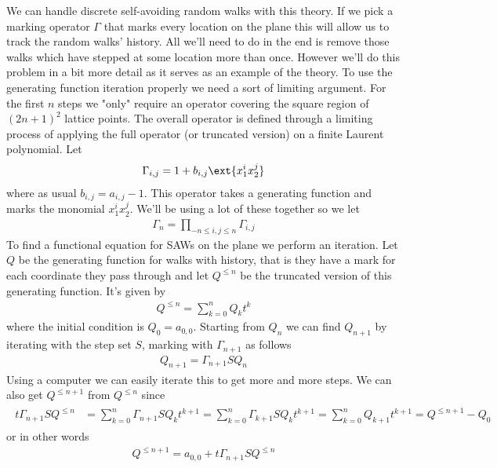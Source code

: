 We can handle discrete self-avoiding random walks with this theory. If we pick a marking operator $\Gamma$ that marks every location on the plane this will allow us to track the random walks' history. All we'll need to do in the end is remove those walks which have stepped at some location more than once. However we'll do this problem in a bit more detail as it serves as an example of the theory. To use the generating function iteration properly we need a sort of limiting argument. For the first $n$ steps we "only" require an operator covering the square region of $(2n+1)^2$ lattice points. The overall operator is defined through a limiting process of applying the full operator (or truncated version) on a finite Laurent polynomial. Let
\begin{align}
\Gamma_{i,j} = 1+b_{i,j}\ext{x_1^ix_2^j}
\end{align}
where as usual $b_{i,j} = a_{i,j}-1$. This operator takes a generating function and marks the monomial $x_1^ix_2^j$. We'll be using a lot of these together so we let
\begin{align}
\Gamma_n = \prod_{-n\leq i,j\leq n}\Gamma_{i,j}
\end{align}
To find a functional equation for SAWs on the plane we perform an iteration. Let $Q$ be the generating function for walks with history, that is they have a mark for each coordinate they pass through and let $Q^{\leq n}$ be the truncated version of this generating function. It's given by
\begin{align}
Q^{\leq n} = \sum_{k=0}^{n} Q_k t^k
\end{align}
where the initial condition is $Q_0 = a_{0,0}$. Starting from $Q_n$ we can find $Q_{n+1}$ by iterating with the step set $S$, marking with $\Gamma_{n+1}$ as follows
\begin{align}
	Q_{n+1} = \Gamma_{n+1}SQ_n
\end{align}
Using a computer we can easily iterate this to get more and more steps. We can also get $Q^{\leq n+1}$ from $Q^{\leq n}$ since
\begin{align}\begin{split}
	t\Gamma_{n+1}SQ^{\leq n} & = \sum_{k=0}^n \Gamma_{n+1}SQ_kt^{k+1}= \sum_{k=0}^n \Gamma_{k+1}SQ_kt^{k+1} = \sum_{k=0}^n Q_{k+1}t^{k+1} = Q^{\leq n+1}-Q_0
\end{split}\end{align}
or in other words
\begin{align}
	 Q^{\leq n+1} = a_{0,0} + t\Gamma_{n+1}SQ^{\leq n}
\end{align}
